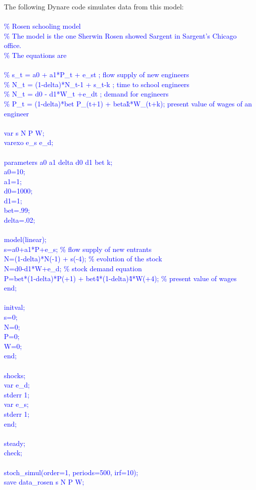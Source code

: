 \documentclass[a4paper,12pt]{scrartcl} %
\begin{document}
The following Dynare code simulates data from this model:\\
\\
\textcolor{blue}{
\% Rosen schooling model\\
\% The model is the one Sherwin Rosen showed Sargent in Sargent's Chicago office.\\
\% The equations are\\
\\
\%  s\_t = a0 + a1*P\_t + e\_st   ;  flow supply of new engineers\\
\%  N\_t = (1-delta)*N\_{t-1} + s\_{t-k} ;  time to school engineers\\
\%  N\_t = d0 - d1*W\_t +e\_dt ; demand for engineers\\
\%  P\_t = (1-delta)*bet P\_(t+1) + beta\^k*W\_(t+k);  present value of wages of an engineer\\
\\
var s N P W;\\
varexo e\_s e\_d;\\
\\
parameters a0 a1 delta d0 d1  bet k;\\
a0=10;\\
a1=1;\\
d0=1000;\\
d1=1;\\
bet=.99;\\
delta=.02;\\
\\
model(linear);\\
s=a0+a1*P+e\_s;  \% flow supply of new entrants\\
N=(1-delta)*N(-1) + s(-4); \% evolution of the stock\\
N=d0-d1*W+e\_d;  \% stock demand equation\\
P=bet*(1-delta)*P(+1) + bet\^4*(1-delta)\^4*W(+4); \% present value of wages\\
end;\\
\\
initval;\\
s=0;\\
N=0;\\
P=0;\\
W=0;\\
end;\\
\\
shocks;\\
var e\_d;\\
stderr 1;\\
var e\_s;\\
stderr 1;\\
end;\\
\\
steady;\\
check;\\
\\
stoch\_simul(order=1, periods=500, irf=10);\\
save data\_rosen s N P W;}\\
\end{document}
